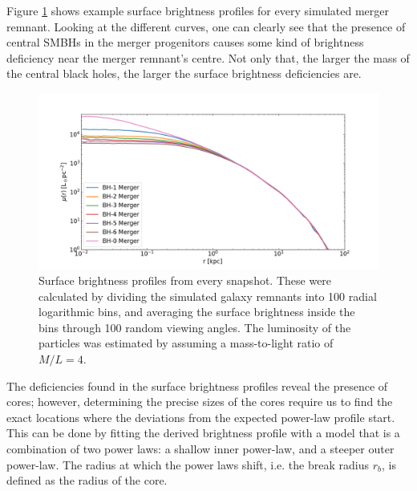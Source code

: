 \documentclass[english, oneside]{HYgradu}
\begin{document}
Figure \ref{figure:surface_brightness} shows example surface brightness profiles for every simulated merger remnant. Looking at the different curves, one can clearly see that the presence of central SMBHs in the merger progenitors causes some kind of brightness deficiency near the merger remnant's centre. Not only that, the larger the mass of the central black holes, the larger the surface brightness deficiencies are.

\begin{figure}[h]
	\centering
	\includegraphics[width=\textwidth]{SurfaceBrightnessProfiles.png}
	\caption{Surface brightness profiles from every snapshot. These were calculated by dividing the simulated galaxy remnants into 100 radial logarithmic bins, and averaging the surface brightness inside the bins through 100 random viewing angles. The luminosity of the particles was estimated by assuming a mass-to-light ratio of $M/L = 4$.}
	\label{figure:surface_brightness}
\end{figure}

The deficiencies found in the surface brightness profiles reveal the presence of cores; however, determining the precise sizes of the cores require us to find the exact locations where the deviations from the expected power-law profile start. This can be done by fitting the derived brightness profile with a model that is a combination of two power laws: a shallow inner power-law, and a steeper outer power-law. The radius at which the power laws shift, i.e. the break radius $r_b$, is defined as the radius of the core. 
\end{document}
